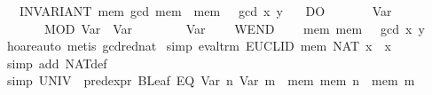 \begin{isabellebody}
\ \ \ INVARIANT\ {}mem{}\ gcd\ {}mem\ {}{}\ {}mem\ {}{}\ {}\ gcd\ x\ y{}\isanewline
\ \ \ DO\isanewline
\ \ \ \ \ {}\ {}{}\ Var\ {}{}\isanewline
\ \ \ \ \ {}\ {}{}\ MOD\ {}Var\ {}{}\ {}Var\ {}{}{}\isanewline
\ \ \ \ \ {}\ {}{}\ Var\ {}\isanewline
\ \ \ WEND\isanewline
\ \ \ {}\ {}mem{}\ mem\ {}\ {}\ gcd\ x\ y{}{}\isanewline
%
\isadelimproof
\ \ %
\endisadelimproof
%
\isatagproof
{}\isamarkupfalse%
\ hoare{}auto\ {}metis\ gcd{}red{}nat{}%
\endisatagproof
{\isafoldproof}%
%
\isadelimproof
\isanewline
%
\endisadelimproof
\isanewline
{}\isamarkupfalse%
\ {}simp{}{}\ {}eval{}trm\ EUCLID\ mem\ {}NAT\ x{}\ {}\ x{}\isanewline
%
\isadelimproof
\ \ %
\endisadelimproof
%
\isatagproof
{}\isamarkupfalse%
\ {}simp\ add{}\ NAT{}def{}%
\endisatagproof
{\isafoldproof}%
%
\isadelimproof
\isanewline
%
\endisadelimproof
\isanewline
{}\isamarkupfalse%
\ {}simp{}{}\ {}UNIV\ {}\ pred{}expr\ {}BLeaf\ {}EQ\ {}Var\ n{}\ {}Var\ m{}{}{}\ {}\ {}mem{}\ mem\ n\ {}\ mem\ m{}{}\isanewline

\end{isabellebody}
